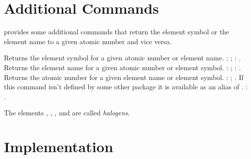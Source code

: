 \documentclass[toc=index]{cnpkgdoc}
\begin{document}
\begin{beispiel}
  
\end{beispiel}

\begin{beispiel}
  
\end{beispiel}

\begin{beispiel}
  
\end{beispiel}

\section{Additional Commands}\label{sec:additional}
\BOHR provides some additional commands that return the element symbol or the
element name to a given atomic number and vice versa.
\begin{beschreibung}
 \newline
   Returns the element symbol for a given atomic number or element name.
   : ; :
   .
 \newline
   Returns the element name for a given atomic number or element symbol.
   : ; : .
 \newline
   Returns the atomic number for a given element name or element symbol.
   : ; 
   .
 \newline
   If this command isn't defined by some other package it is available as an
   alias of . : .
\end{beschreibung}

\begin{beispiel}
 The elements , , ,
  and  are called \emph{halogens}.
\end{beispiel}

\section{Implementation}
\implementation

\printindex
\end{document}
